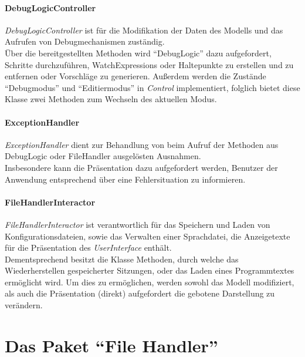 \documentclass[parskip=full]{scrartcl}
\begin{document}
\paragraph{DebugLogicController}
    \textit{DebugLogicController} ist für die Modifikation der Daten des Modells und das Aufrufen von Debugmechanismen zuständig.\\
    Über die bereitgestellten Methoden wird \enquote{DebugLogic} dazu aufgefordert, Schritte durchzuführen, WatchExpressions oder Haltepunkte zu erstellen und zu entfernen oder Vorschläge zu generieren.
    Außerdem werden die Zustände \enquote{Debugmodus} und \enquote{Editiermodus} in \textit{Control} implementiert, folglich bietet diese Klasse zwei Methoden zum Wechseln des aktuellen Modus.
\paragraph{ExceptionHandler}
    \textit{ExceptionHandler} dient zur Behandlung von beim Aufruf der Methoden aus DebugLogic oder FileHandler ausgelösten Ausnahmen.\\
    Insbesondere kann die Präsentation dazu aufgefordert werden, Benutzer der Anwendung entsprechend über eine Fehlersituation zu informieren.
\paragraph{FileHandlerInteractor}
    \textit{FileHandlerInteractor} ist verantwortlich für das Speichern und Laden von Konfigurationsdateien, sowie das Verwalten einer Sprachdatei, die Anzeigetexte für die Präsentation des \textit{UserInterface} enthält.\\
    Dementsprechend besitzt die Klasse Methoden, durch welche das Wiederherstellen gespeicherter Sitzungen, oder das Laden eines Programmtextes ermöglicht wird.
    Um dies zu ermöglichen, werden sowohl das Modell modifiziert, als auch die Präsentation (direkt) aufgefordert die gebotene Darstellung zu verändern.

\section{Das Paket \enquote{File Handler}}
\label{FileHandler}
\end{document}
